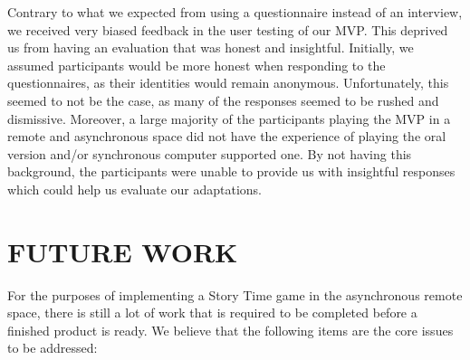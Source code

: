\documentclass{sigchi}
\begin{document}
Contrary to what we expected from using a questionnaire instead of an interview, we received very biased feedback in the user testing of our MVP. This deprived us from having an evaluation that was honest and insightful. Initially, we assumed participants would be more honest when responding to the questionnaires, as their identities would remain anonymous. Unfortunately, this seemed to not be the case, as many of the responses seemed to be rushed and dismissive. Moreover, a large majority of the participants playing the MVP in a remote and asynchronous space did not have the experience of playing the oral version and/or synchronous computer supported one. By not having this background, the participants were unable to provide us with insightful responses which could help us evaluate our adaptations.

\section{FUTURE WORK}
For the purposes of implementing a Story Time game in the asynchronous remote space, there is still a lot of work that is required to be completed before a finished product is ready. We believe that the following items are the core issues to be addressed: 
\end{document}
